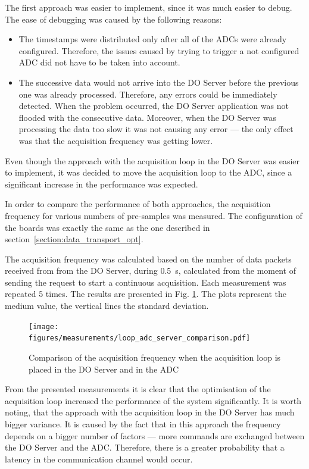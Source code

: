         The first approach was easier to implement, since it was much easier to debug. The ease of debugging was caused by the following reasons:
        \begin{itemize}
            \item The timestamps were distributed only after all of the ADCs were already configured. Therefore, the issues caused by trying to trigger a not configured ADC did not have to be taken into account.
            \item The successive data would not arrive into the DO Server before the previous one was already processed. Therefore, any errors could be immediately detected. When the problem occurred, the DO Server application was not flooded with the consecutive data. Moreover, when the DO Server was processing the data too slow it was not causing any error --- the only effect was that the acquisition frequency was getting lower.
        \end{itemize}
        
        Even though the approach with the acquisition loop in the DO Server was easier to implement, it was decided to move the acquisition loop to the ADC, since a significant increase in the performance was expected.
        
        In order to compare the performance of both approaches, the acquisition frequency for various numbers of pre-samples was measured. The configuration of the boards was exactly the same as the one described in section~\ref{section:data_transport_opt}.
        
        The acquisition frequency was calculated based on the number of data packets received from from the DO Server, during 0.5~s, calculated from the moment of sending the request to start a continuous acquisition. Each measurement was repeated 5 times. The results are presented in Fig. \ref{fig:meas:loop_adc_server_comp}. The plots represent the medium value, the vertical lines the standard deviation. 
        
        \begin{figure}
        	\centerline{\texttt{[image: figures/measurements/loop\_adc\_server\_comparison.pdf]}}
        	\caption{Comparison of the acquisition frequency when the acquisition loop is placed in the DO Server and in the ADC}
            	\label{fig:meas:loop_adc_server_comp}
        \end{figure}
        
        From the presented measurements it is clear that the optimisation of the acquisition loop increased the performance of the system significantly. It is worth noting, that the approach with the acquisition loop in the DO Server has much bigger variance. It is caused by the fact that in this approach the frequency depends on a bigger number of factors --- more commands are exchanged between the DO Server and the ADC. Therefore, there is a greater probability that a latency in the communication channel would occur.
        
